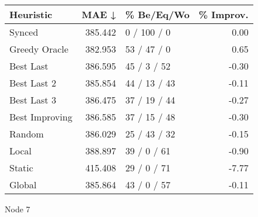 \begin{tabular}{lrlr}
\toprule
\textbf{Heuristic} & \textbf{MAE ↓} & \textbf{\% Be/Eq/Wo} & \textbf{\% Improv.} \\
\midrule
            Synced &        385.442 &          0 / 100 / 0 &                0.00 \\
     Greedy Oracle &        382.953 &          53 / 47 / 0 &                0.65 \\
         Best Last &        386.595 &          45 / 3 / 52 &               -0.30 \\
       Best Last 2 &        385.854 &         44 / 13 / 43 &               -0.11 \\
       Best Last 3 &        386.475 &         37 / 19 / 44 &               -0.27 \\
    Best Improving &        386.585 &         37 / 15 / 48 &               -0.30 \\
            Random &        386.029 &         25 / 43 / 32 &               -0.15 \\
             Local &        388.897 &          39 / 0 / 61 &               -0.90 \\
            Static &        415.408 &          29 / 0 / 71 &               -7.77 \\
            Global &        385.864 &          43 / 0 / 57 &               -0.11 \\
\bottomrule
\end{tabular}
\caption{Node 7}
\label{tab:iid_lr05_le1_bs4_7}
